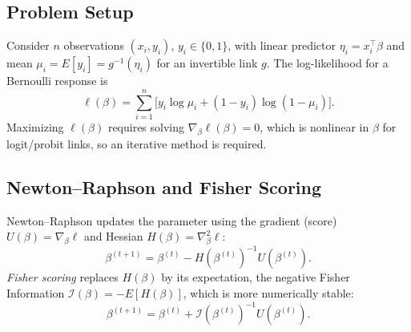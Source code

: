 \documentclass[a4paper,11pt]{article}
\begin{document}
\subsection{Problem Setup}
Consider $n$ observations $(x_i, y_i)$, $y_i \in \{0,1\}$, with linear predictor $\eta_i = x_i^\top \beta$ and mean $\mu_i = E[y_i] = g^{-1}(\eta_i)$ for an invertible link $g$. The log-likelihood for a Bernoulli response is
\begin{equation}
\ell(\beta) = \sum_{i=1}^n \Big[ y_i \log \mu_i + (1-y_i)\log(1-\mu_i) \Big].
\end{equation}
Maximizing $\ell(\beta)$ requires solving $\nabla_\beta \ell(\beta) = 0$, which is nonlinear in $\beta$ for logit/probit links, so an iterative method is required.

\subsection{Newton--Raphson and Fisher Scoring}
Newton--Raphson updates the parameter using the gradient (score) $U(\beta)=\nabla_\beta \ell$ and Hessian $H(\beta)=\nabla^2_\beta \ell$:
\begin{equation}
\beta^{(t+1)} = \beta^{(t)} - H(\beta^{(t)})^{-1} U(\beta^{(t)}).
\end{equation}
\emph{Fisher scoring} replaces $H(\beta)$ by its expectation, the negative Fisher Information $\mathcal{I}(\beta) = -E[H(\beta)]$, which is more numerically stable:
\begin{equation}
\beta^{(t+1)} = \beta^{(t)} + \mathcal{I}(\beta^{(t)})^{-1} U(\beta^{(t)}).
\label{eq:fisher}
\end{equation}
\end{document}
